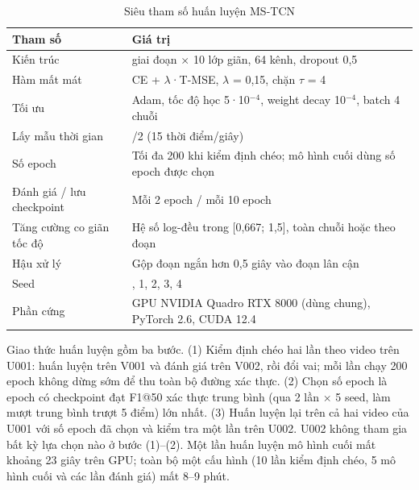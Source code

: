 \begin{table}[H]
\centering
\caption{Siêu tham số huấn luyện MS-TCN}
\small
\setlength{\tabcolsep}{3pt}\renewcommand{\arraystretch}{1.15}
\begin{tabular}{@{}>{\raggedright\arraybackslash}p{}>{\centering\arraybackslash}p{}@{}}
\toprule
\textbf{Tham số} & \textbf{Giá trị} \\\midrule
Kiến trúc & 4 giai đoạn $\times$ 10 lớp giãn, 64 kênh, dropout 0,5 \\
Hàm mất mát & CE + $\lambda$·T-MSE, $\lambda$ = 0,15, chặn $\tau$ = 4 \\
Tối ưu & Adam, tốc độ học 5·10$^{-4}$, weight decay 10$^{-4}$, batch 4 chuỗi \\
Lấy mẫu thời gian & 1/2 (15 thời điểm/giây) \\
Số epoch & Tối đa 200 khi kiểm định chéo; mô hình cuối dùng số epoch được chọn \\
Đánh giá / lưu checkpoint & Mỗi 2 epoch / mỗi 10 epoch \\
Tăng cường co giãn tốc độ & Hệ số log-đều trong [0,667; 1,5], toàn chuỗi hoặc theo đoạn \\
Hậu xử lý & Gộp đoạn ngắn hơn 0,5 giây vào đoạn lân cận \\
Seed & 0, 1, 2, 3, 4 \\
Phần cứng & GPU NVIDIA Quadro RTX 8000 (dùng chung), PyTorch 2.6, CUDA 12.4 \\
\bottomrule
\end{tabular}
\end{table}

Giao thức huấn luyện gồm ba bước. (1) Kiểm định chéo hai lần theo video trên U001: huấn luyện trên V001 và đánh giá trên V002, rồi đổi vai; mỗi lần chạy 200 epoch không dừng sớm để thu toàn bộ đường xác thực. (2) Chọn số epoch là epoch có checkpoint đạt F1@50 xác thực trung bình (qua 2 lần $\times$ 5 seed, làm mượt trung bình trượt 5 điểm) lớn nhất. (3) Huấn luyện lại trên cả hai video của U001 với số epoch đã chọn và kiểm tra một lần trên U002. U002 không tham gia bất kỳ lựa chọn nào ở bước (1)–(2). Một lần huấn luyện mô hình cuối mất khoảng 23 giây trên GPU; toàn bộ một cấu hình (10 lần kiểm định chéo, 5 mô hình cuối và các lần đánh giá) mất 8–9 phút.
